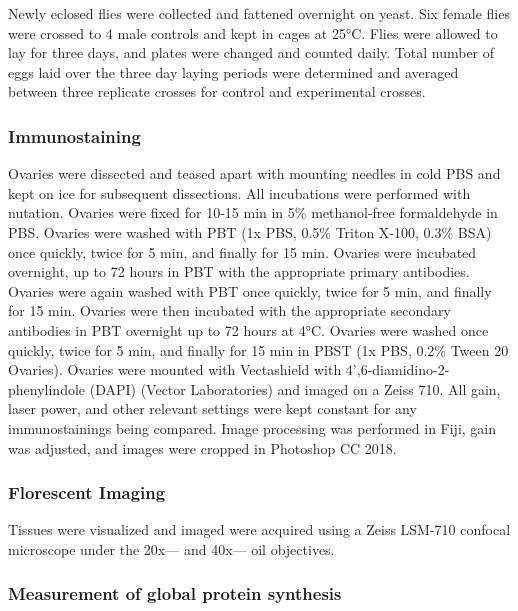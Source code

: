 \documentclass[12pt,oneside]{reedthesis}
\begin{document}
Newly eclosed flies were collected and fattened overnight on yeast. Six female flies were crossed to 4 male controls and kept in cages at 25°C. Flies were allowed to lay for three days, and plates were changed and counted daily. Total number of eggs laid over the three day laying periods were determined and averaged between three replicate crosses for control and experimental crosses.

\hypertarget{immunostaining}{%
\subsubsection{Immunostaining}\label{immunostaining}}

Ovaries were dissected and teased apart with mounting needles in cold PBS and kept on ice for subsequent dissections. All incubations were performed with nutation. Ovaries were fixed for 10-15 min in 5\% methanol-free formaldehyde in PBS. Ovaries were washed with PBT (1x PBS, 0.5\% Triton X-100, 0.3\% BSA) once quickly, twice for 5 min, and finally for 15 min. Ovaries were incubated overnight, up to 72 hours in PBT with the appropriate primary antibodies. Ovaries were again washed with PBT once quickly, twice for 5 min, and finally for 15 min. Ovaries were then incubated with the appropriate secondary antibodies in PBT overnight up to 72 hours at 4°C. Ovaries were washed once quickly, twice for 5 min, and finally for 15 min in PBST (1x PBS, 0.2\% Tween 20 Ovaries). Ovaries were mounted with Vectashield with 4',6-diamidino-2-phenylindole (DAPI) (Vector Laboratories) and imaged on a Zeiss 710. All gain, laser power, and other relevant settings were kept constant for any immunostainings being compared. Image processing was performed in Fiji, gain was adjusted, and images were cropped in Photoshop CC 2018.

\hypertarget{florescent-imaging}{%
\subsubsection{Florescent Imaging}\label{florescent-imaging}}

Tissues were visualized and imaged were acquired using a Zeiss LSM-710 confocal microscope under the 20x--- and 40x--- oil objectives.

\hypertarget{measurement-of-global-protein-synthesis}{%
\subsubsection{Measurement of global protein synthesis}\label{measurement-of-global-protein-synthesis}}
\end{document}
